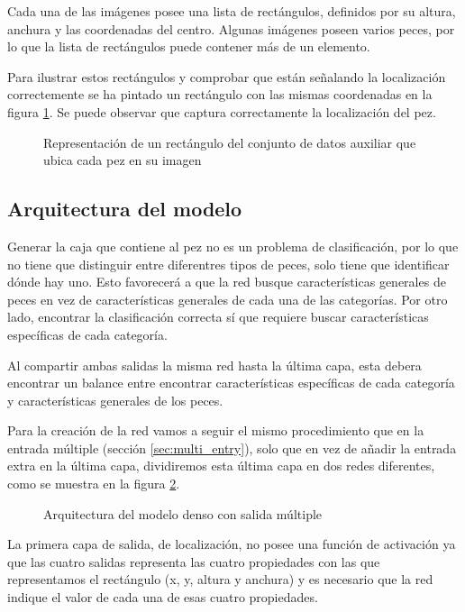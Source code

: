 Cada una de las imágenes posee una lista de rectángulos, definidos por su
altura, anchura y las coordenadas del centro. Algunas imágenes poseen varios
peces, por lo que la lista de rectángulos puede contener más de un elemento.

Para ilustrar estos rectángulos y comprobar que están señalando la localización
correctemente se ha pintado un rectángulo con las mismas coordenadas en la
figura \ref{box}. Se puede observar que captura correctamente la localización
del pez.


\begin{figure}
  \caption{Representación de un rectángulo del conjunto de datos auxiliar que ubica cada pez en su imagen}
\label{box}
\end{figure}


\subsection{Arquitectura del modelo}

Generar la caja que contiene al pez no es un problema de clasificación, por lo
que no tiene que distinguir entre diferentres tipos de peces, solo tiene que
identificar dónde hay uno. Esto favorecerá a que la red busque características
generales de peces en vez de características generales de cada una de las
categorías. Por otro lado, encontrar la clasificación correcta sí que requiere
buscar características específicas de cada categoría.

Al compartir ambas salidas la misma red hasta la última capa, esta debera
encontrar un balance entre encontrar características específicas de cada categoría y
características generales de los peces.

Para la creación de la red vamos a seguir el mismo procedimiento que en la
entrada múltiple (sección \ref{sec:multi_entry}), solo que en vez de añadir la
entrada extra en la última capa, dividiremos esta última capa en dos redes
diferentes, como se muestra en la figura \ref{multi_output_arch}.

\begin{figure}
  \caption{Arquitectura del modelo denso con salida múltiple}
\label{multi_output_arch}
\end{figure}


La primera capa de salida, de localización, no posee una función de activación
ya que las cuatro salidas representa las cuatro propiedades con las que
representamos el rectángulo (x, y, altura y anchura) y es necesario que la red
indique el valor de cada una de esas cuatro propiedades.

